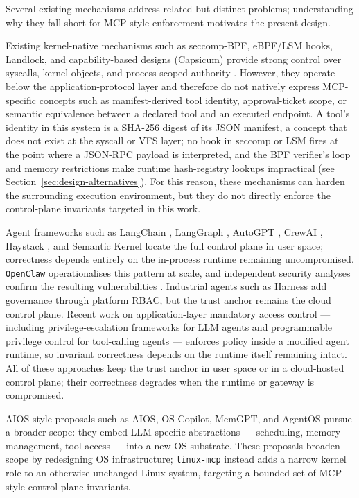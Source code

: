 Several existing mechanisms address related but distinct problems; understanding why they fall short for MCP-style enforcement motivates the present design.

Existing kernel-native mechanisms such as seccomp-BPF, eBPF/LSM hooks, Landlock, and capability-based designs (Capsicum) provide strong control over syscalls, kernel objects, and process-scoped authority \cite{seccomp2026, lsm2026, landlock2026, lefeuvre2024sok, brimhall2023mac}.
However, they operate below the application-protocol layer and therefore do not natively express MCP-specific concepts such as manifest-derived tool identity, approval-ticket scope, or semantic equivalence between a declared tool and an executed endpoint.
A tool's identity in this system is a SHA-256 digest of its JSON manifest, a concept that does not exist at the syscall or VFS layer; no hook in seccomp or LSM fires at the point where a JSON-RPC payload is interpreted, and the BPF verifier's loop and memory restrictions make runtime hash-registry lookups impractical (see Section~\ref{sec:design-alternatives}).
For this reason, these mechanisms can harden the surrounding execution environment, but they do not directly enforce the control-plane invariants targeted in this work.

Agent frameworks such as LangChain \cite{langchain2022}, LangGraph \cite{langgraph2024}, AutoGPT \cite{autogpt2023}, CrewAI \cite{crewai2024}, Haystack \cite{haystack2023}, and Semantic Kernel \cite{semantickernel2023} locate the full control plane in user space; correctness depends entirely on the in-process runtime remaining uncompromised.
\texttt{OpenClaw} \cite{openclaw2026} operationalises this pattern at scale, and independent security analyses confirm the resulting vulnerabilities \cite{openclaw_security1, openclaw_security2}.
Industrial agents such as Harness \cite{harness2025} add governance through platform RBAC, but the trust anchor remains the cloud control plane.
Recent work on application-layer mandatory access control — including privilege-escalation frameworks for LLM agents \cite{ji2026seagent} and programmable privilege control for tool-calling agents \cite{shi2025progent} — enforces policy inside a modified agent runtime, so invariant correctness depends on the runtime itself remaining intact.
All of these approaches keep the trust anchor in user space or in a cloud-hosted control plane; their correctness degrades when the runtime or gateway is compromised.

AIOS-style proposals such as AIOS, OS-Copilot, MemGPT, and AgentOS \cite{mei2024aios, wu2024oscopilot, packer2023memgpt, liu2026agentos} pursue a broader scope: they embed LLM-specific abstractions — scheduling, memory management, tool access — into a new OS substrate.
These proposals broaden scope by redesigning OS infrastructure; \texttt{linux-mcp} instead adds a narrow kernel role to an otherwise unchanged Linux system, targeting a bounded set of MCP-style control-plane invariants.


